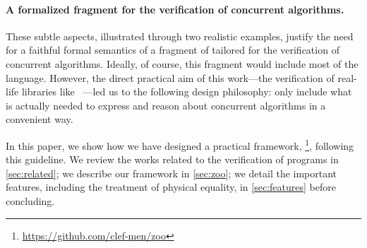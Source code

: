 \paragraph{A formalized \OCaml fragment for the verification of concurrent algorithms.}

These subtle aspects, illustrated through two realistic examples, justify the need for a faithful formal semantics of a fragment of \OCaml tailored for the verification of concurrent algorithms.
Ideally, of course, this fragment would include most of the language.
However, the direct practical aim of this work---the verification of real-life libraries like \Saturn~\cite{saturn}---led us to the following design philosophy: only include what is actually needed to express and reason about concurrent algorithms in a convenient way.

In this paper, we show how we have designed a practical framework, \Zoo\footnote{\url{https://github.com/clef-men/zoo}}, following this guideline.
We review the works related to the verification of \OCaml programs in \cref{sec:related}; we describe our framework in \cref{sec:zoo}; we detail the important features, including the treatment of physical equality, in \cref{sec:features} before concluding.


